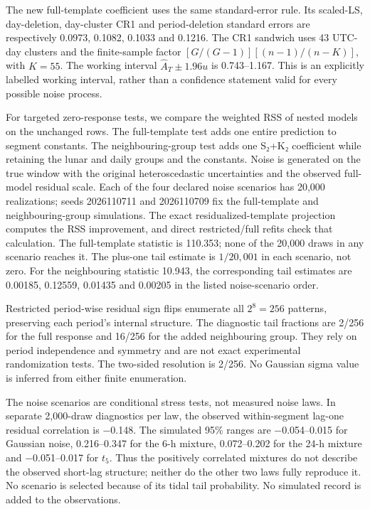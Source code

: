 \documentclass[
  12pt,
  a4paper,
]{article}
\begin{document}
The new full-template coefficient uses the same standard-error rule. Its
scaled-LS, day-deletion, day-cluster CR1 and period-deletion standard
errors are respectively 0.0973, 0.1082, 0.1033 and 0.1216. The CR1
sandwich uses 43 UTC-day clusters and the finite-sample factor
\([G/(G-1)][(n-1)/(n-K)]\), with \(K=55\). The working interval
\(\widehat A_T\pm1.96u\) is 0.743--1.167. This is an explicitly labelled
working interval, rather than a confidence statement valid for every
possible noise process.

For targeted zero-response tests, we compare the weighted RSS of nested
models on the unchanged rows. The full-template test adds one entire
prediction to segment constants. The neighbouring-group test adds one
S₂+K₂ coefficient while retaining the lunar and daily groups and the
constants. Noise is generated on the true window with the original
heteroscedastic uncertainties and the observed full-model residual
scale. Each of the four declared noise scenarios has 20,000
realizations; seeds 2026110711 and 2026110709 fix the full-template and
neighbouring-group simulations. The exact residualized-template
projection computes the RSS improvement, and direct restricted/full
refits check that calculation. The full-template statistic is 110.353;
none of the 20,000 draws in any scenario reaches it. The plus-one tail
estimate is \(1/20,001\) in each scenario, not zero. For the
neighbouring statistic 10.943, the corresponding tail estimates are
0.00185, 0.12559, 0.01435 and 0.00205 in the listed noise-scenario
order.

Restricted period-wise residual sign flips enumerate all \(2^8=256\)
patterns, preserving each period's internal structure. The diagnostic
tail fractions are 2/256 for the full response and 16/256 for the added
neighbouring group. They rely on period independence and symmetry and
are not exact experimental randomization tests. The two-sided resolution
is 2/256. No Gaussian sigma value is inferred from either finite
enumeration.

The noise scenarios are conditional stress tests, not measured noise
laws. In separate 2,000-draw diagnostics per law, the observed
within-segment lag-one residual correlation is −0.148. The simulated
95\% ranges are −0.054--0.015 for Gaussian noise, 0.216--0.347 for the
6-h mixture, 0.072--0.202 for the 24-h mixture and −0.051--0.017 for
\(t_5\). Thus the positively correlated mixtures do not describe the
observed short-lag structure; neither do the other two laws fully
reproduce it. No scenario is selected because of its tidal tail
probability. No simulated record is added to the observations.
\end{document}
